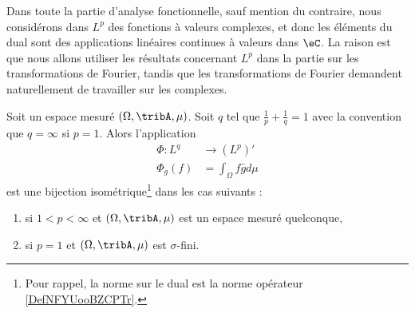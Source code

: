 Dans toute la partie d'analyse fonctionnelle, sauf mention du contraire, nous considérons dans \( L^p\) des fonctions à valeurs complexes, et donc les éléments du dual sont des applications linéaires continues à valeurs dans \( \eC\). La raison est que nous allons utiliser les résultats concernant \( L^p\) dans la partie sur les transformations de Fourier, tandis que les transformations de Fourier demandent naturellement de travailler sur les complexes.

\begin{theorem}
\label{ThoLPQPooPWBXuv}
Soit un espace mesuré \( (\Omega,\tribA,\mu)\). Soit \( q\) tel que \( \frac{1}{ p }+\frac{1}{ q }=1\) avec la convention que \( q=\infty\) si \( p=1\). Alors l'application
\begin{equation}
    \begin{aligned}
        \Phi\colon L^q & \to (L^p)'                \\
        \Phi_g(f)      & =\int_{\Omega}f\bar gd\mu
    \end{aligned}
\end{equation}
est une bijection isométrique\footnote{Pour rappel, la norme sur le dual est la norme opérateur \ref{DefNFYUooBZCPTr}.} dans les cas suivants :
\begin{enumerate}
    \item       \label{ITEMooSQQBooWSFBmX}
          si \( 1<p<\infty\) et \( (\Omega,\tribA,\mu)\) est un espace mesuré quelconque,
    \item       \label{ITEMooCQGJooOWzjoV}
          si \( p=1\) et \( (\Omega,\tribA, \mu)\) est \( \sigma\)-fini.
\end{enumerate}
\end{theorem}

